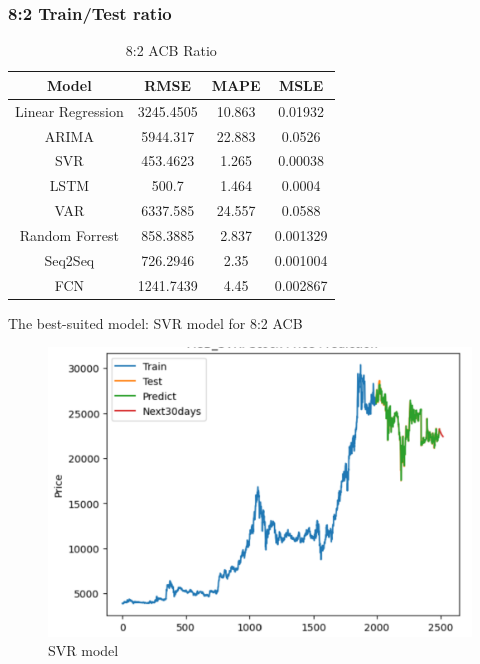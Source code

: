 \documentclass{ieeeojies}
\begin{document}
\subsubsection{8:2 Train/Test ratio}
\begin{table}[H]
    \centering
    \begin{tabular}{|c|c|c|c|}
    \hline
    Model & \textbf{RMSE} & \textbf{MAPE} & \textbf{MSLE} \\
    \hline
    Linear Regression & 3245.4505 & 10.863 & 0.01932 \\
    \hline
    ARIMA & 5944.317 & 22.883 & 0.0526 \\
    \hline
    \rowcolor{red!10}
    SVR & 453.4623 & 1.265 & 0.00038 \\
    \hline
    LSTM & 500.7 & 1.464 & 0.0004 \\
    \hline
    VAR & 6337.585 & 24.557 & 0.0588 \\
    \hline
    Random Forrest & 858.3885 & 2.837 & 0.001329 \\
    \hline
    Seq2Seq & 726.2946 & 2.35 & 0.001004 \\
    \hline
    FCN & 1241.7439 & 4.45 & 0.002867 \\
    \hline
    \end{tabular}
    \caption{8:2 ACB Ratio}
    \label{8:2 VCB}
\end{table}
The best-suited model: SVR model for 8:2 ACB
\begin{figure}[H]
    \centering
    \includegraphics[width=1\linewidth]{acb_svr_82.png}
    \caption{SVR model}
    \label{fig:enter-label}
\end{figure}
\end{document}
